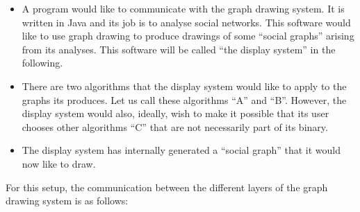 \begin{itemize}
\item A program would like to communicate with the graph
  drawing system. It is written in Java and its job is to analyse social
  networks. This software would like to use graph drawing to produce
  drawings of some ``social graphs'' arising from its analyses. This
  software will be called ``the display system'' in the following.
\item There are two algorithms that the display system would like to apply to
  the graphs its produces. Let us call these algorithms ``A'' and
  ``B''. However, the display system would also, ideally, wish to make it
  possible that its user chooses other algorithms ``C'' that are not
  necessarily part of its binary.
\item The display system has internally generated a ``social graph'' that it
  would now like to draw.
\end{itemize}

For this setup, the communication between the different layers of the
graph drawing system is as follows:

